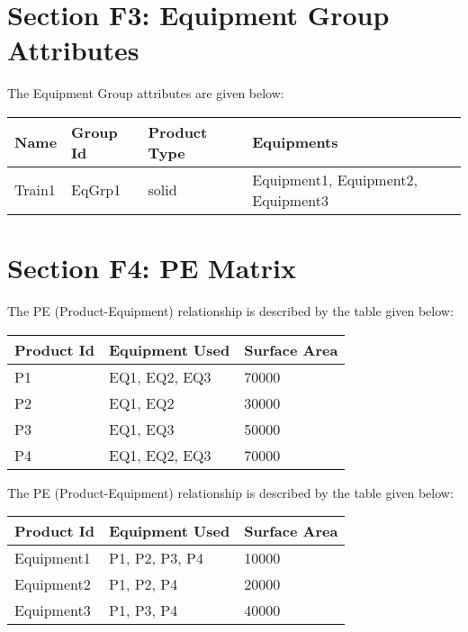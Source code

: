 \documentclass{article}
\begin{document}
        \section{Section F3: Equipment Group Attributes}
        The Equipment Group attributes are given below:
        \begin{longtable}[l]{ |p{2cm} |p{2cm} |p{2.5cm} |p{6cm}|}
        \hline

        Name & Group Id & Product Type & Equipments\\

        \hline

    Train1 & EqGrp1 & solid & Equipment1, Equipment2, Equipment3\\
\hline

    \end{longtable}
    
        
        \newpage
        \section{Section F4: PE Matrix}
        The PE (Product-Equipment) relationship is described by the table given below:
        \begin{longtable}[l]{ |p{3cm} |p{5cm} |p{3cm}|}
        \hline

        Product Id & Equipment Used & Surface Area\\

        \hline

    P1 & EQ1, EQ2, EQ3 & 70000\\
\hline
P2 & EQ1, EQ2 & 30000\\
\hline
P3 & EQ1, EQ3 & 50000\\
\hline
P4 & EQ1, EQ2, EQ3 & 70000\\
\hline

    \end{longtable}
    The PE (Product-Equipment) relationship is described by the table given below:
    \begin{longtable}[l]{ |p{3cm} |p{5cm} |p{3cm}|}
    \hline

    Product Id & Equipment Used & Surface Area\\

    \hline

    Equipment1 & P1, P2, P3, P4 & 10000\\
\hline
Equipment2 & P1, P2, P4 & 20000\\
\hline
Equipment3 & P1, P3, P4 & 40000\\
\hline

    \end{longtable}
    
\end{document}
